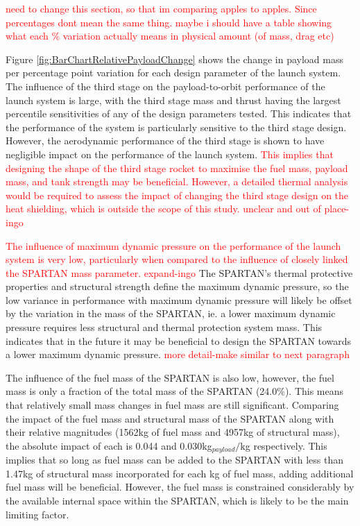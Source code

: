 \textcolor{red}{need to change this section, so that im comparing apples to apples. Since percentages dont mean the same thing. maybe i should have a table showing what each \% variation actually means in physical amount (of mass, drag etc)}

Figure \ref{fig:BarChartRelativePayloadChange} shows the change in payload mass per percentage point variation for each design parameter of the launch system. 
The influence of the third stage on the payload-to-orbit performance of the launch system is large, with the third stage mass and thrust having the largest percentile sensitivities of any of the design parameters tested. This indicates that the performance of the system is particularly sensitive to the third stage design. However, the aerodynamic performance of the third stage is shown to have negligible impact on the performance of the launch system. \textcolor{red}{This implies that designing the shape of the third stage rocket to maximise the fuel mass, payload mass, and tank strength may be beneficial. However, a detailed thermal analysis would be required to assess the impact of changing the third stage design on the heat shielding, which is outside the scope of this study.  unclear and out of place-ingo}


\textcolor{red}{The influence of maximum dynamic pressure on the performance of the launch system is very low, particularly when compared to the influence of closely linked the SPARTAN mass parameter. expand-ingo} The SPARTAN's thermal protective properties and structural strength define the maximum dynamic pressure, so the low variance in performance with maximum dynamic pressure will likely be offset by the variation in the mass of the SPARTAN, ie. a lower maximum dynamic pressure requires less structural and thermal protection system mass. This indicates that in the future it may be beneficial to design the SPARTAN towards a lower maximum dynamic pressure.
\textcolor{red}{more detail-make similar to next paragraph}

The influence of the fuel mass of the SPARTAN is also low, however, the fuel mass is only a fraction of the total mass of the SPARTAN (24.0\%). This means that relatively small mass changes in fuel mass are still significant. Comparing the impact of the fuel mass and structural mass of the SPARTAN along with their relative magnitudes (1562kg of fuel mass and 4957kg of structural mass), the absolute impact of each is 0.044 and 0.030kg$_{payload}/$kg respectively. This implies that so long as fuel mass can be added to the SPARTAN with less than 1.47kg of structural mass incorporated for each kg of fuel mass, adding additional fuel mass will be beneficial. However, the fuel mass is constrained considerably by the available internal space within the SPARTAN, which is likely to be the main limiting factor.



